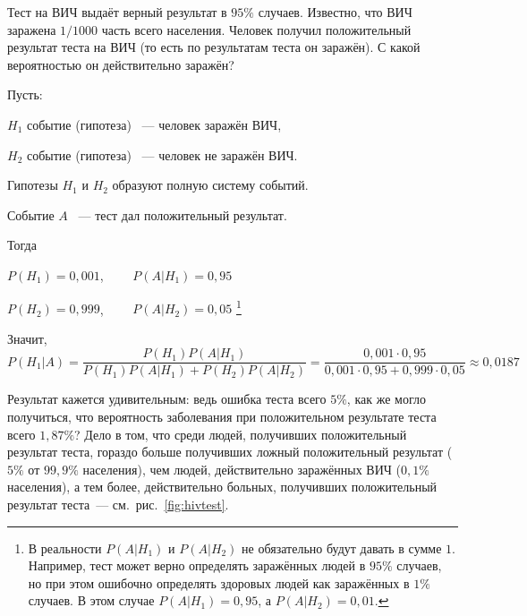 \documentclass[11pt]{article}
\begin{document}
\begin{example}
    Тест на ВИЧ выдаёт верный результат в $95\%$ случаев. Известно, что ВИЧ
    заражена $1/1000$ часть всего населения. Человек получил положительный
    результат теста на ВИЧ (то есть по результатам теста он заражён). С какой
    вероятностью он действительно заражён?
    
    Пусть:
    
    \nopagebreak
    $H_1$ событие (гипотеза) ~--- человек заражён ВИЧ,
    
    \nopagebreak
    $H_2$ событие (гипотеза) ~--- человек не заражён ВИЧ.
    
    Гипотезы $H_1$ и $H_2$ образуют полную систему событий.
    
    Событие $A$ ~--- тест дал положительный результат.
    
    Тогда
    
    \nopagebreak
    \vspace{0.2em}

    \nopagebreak
    $P(H_1)=0,001$,~~~~      $P(A \vert H_1)=0,95 $
    
    \nopagebreak
    $P(H_2)=0,999$,~~~~      $P(A \vert H_2)=0,05$ \footnote{
        В реальности $P(A \vert H_1)$ и $P(A \vert H_2)$ не обязательно будут
        давать в сумме $1$. Например, тест может верно определять заражённых людей
        в $95\%$ случаев, но при этом ошибочно определять здоровых людей как
        заражённых в $1\%$ случаев. В этом случае $P(A \vert H_1) = 0,95$, а
        $P(A \vert H_2) = 0,01$.
    }

    \vspace{0.2em}

    Значит,
    $$
        P(H_1 \vert A)
        =\frac{P(H_1)P(A \vert H_1)}
        {P(H_1)P(A \vert H_1)+P(H_2)P(A \vert H_2)}
        =\frac{0,001\cdot0,95}{0,001\cdot0,95+0,999\cdot0,05}\approx0,0187
    $$
    
    Результат кажется удивительным: ведь ошибка теста всего $5\%$, как же могло
    получиться, что вероятность заболевания при положительном результате теста
    всего $1,87\%$? Дело в том, что среди людей, получивших положительный
    результат теста, гораздо больше получивших ложный положительный результат
    ($5\%$ от $99,9\%$ населения), чем людей, действительно заражённых ВИЧ
    ($0{,}1\%$ населения), а тем более, действительно больных, получивших
    положительный результат теста~--- см.~рис.~\ref{fig:hivtest}.

    \begin{figure}[htb]
    \centering
    \resizebox{0.95\textwidth}{!}{%
		\begin{tikzpicture}[>={Latex[length=3mm,width=2mm]}, line width=0.5pt]
            

\end{tikzpicture}}
\end{figure}
\end{example}
\end{document}
